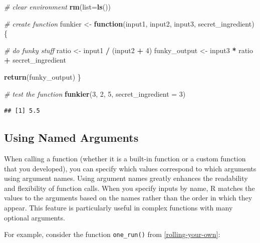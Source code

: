 \documentclass[
]{book}
\newenvironment{Shaded}{\begin{snugshade}}{\end{snugshade}}
\newcommand{\AttributeTok}[1]{\textcolor[rgb]{0.13,0.29,0.53}{#1}}
\newcommand{\CommentTok}[1]{\textcolor[rgb]{0.56,0.35,0.01}{\textit{#1}}}
\newcommand{\ControlFlowTok}[1]{\textcolor[rgb]{0.13,0.29,0.53}{\textbf{#1}}}
\newcommand{\DecValTok}[1]{\textcolor[rgb]{0.00,0.00,0.81}{#1}}
\newcommand{\FunctionTok}[1]{\textcolor[rgb]{0.13,0.29,0.53}{\textbf{#1}}}
\newcommand{\NormalTok}[1]{#1}
\newcommand{\OtherTok}[1]{\textcolor[rgb]{0.56,0.35,0.01}{#1}}
\newcommand{\SpecialCharTok}[1]{\textcolor[rgb]{0.81,0.36,0.00}{\textbf{#1}}}
\begin{document}
\begin{Shaded}
\begin{Highlighting}[]
\CommentTok{\# clear environment}
\FunctionTok{rm}\NormalTok{(}\AttributeTok{list=}\FunctionTok{ls}\NormalTok{()) }

\CommentTok{\# create function}
\NormalTok{funkier }\OtherTok{\textless{}{-}} \ControlFlowTok{function}\NormalTok{(input1, input2, input3, secret\_ingredient) \{}
  
  \CommentTok{\# do funky stuff}
\NormalTok{  ratio }\OtherTok{\textless{}{-}}\NormalTok{ input1 }\SpecialCharTok{/}\NormalTok{ (input2 }\SpecialCharTok{+} \DecValTok{4}\NormalTok{)}
\NormalTok{  funky\_output }\OtherTok{\textless{}{-}}\NormalTok{ input3 }\SpecialCharTok{*}\NormalTok{ ratio }\SpecialCharTok{+}\NormalTok{ secret\_ingredient}
  
  \FunctionTok{return}\NormalTok{(funky\_output)  }
\NormalTok{\}}


\CommentTok{\# test the function}
\FunctionTok{funkier}\NormalTok{(}\DecValTok{3}\NormalTok{, }\DecValTok{2}\NormalTok{, }\DecValTok{5}\NormalTok{, }\AttributeTok{secret\_ingredient =} \DecValTok{3}\NormalTok{)}
\end{Highlighting}
\end{Shaded}

\begin{verbatim}
## [1] 5.5
\end{verbatim}

\subsection{Using Named Arguments}\label{using-named-arguments}

When calling a function (whether it is a built-in function or a custom function that you developed), you can specify which values correspond to which arguments using argument names.
Using argument names greatly enhances the readability and flexibility of function calls.
When you specify inputs by name, R matches the values to the arguments based on the names rather than the order in which they appear.
This feature is particularly useful in complex functions with many optional arguments.

For example, consider the function \texttt{one\_run()} from \ref{rolling-your-own}:

\begin{Shaded}
\end{Shaded}
\end{document}
